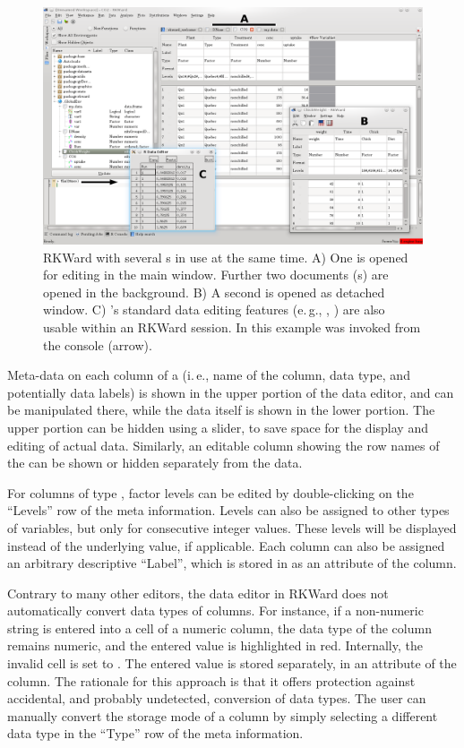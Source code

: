 \begin{figure}[htp]
 \centering
 \includegraphics[width=15.5cm]{../figures/data_editors.png}
 \caption{RKWard with several s in use at the same time. A) 
  One  is opened for editing in the main window. Further 
  two documents (s) are opened in the background. 
  B) A second  is opened as detached window. 
  C) 's standard data editing features (e.\,g., , ) 
  are also usable within an RKWard session. In this example  
  was invoked from the console (arrow).}
 \label{fig:data_editors}
\end{figure}

Meta-data on each column of a  (i.\,e., name of the column, data
type, and potentially data labels) is shown in the upper portion of
the data editor, and can be manipulated there, while the data itself is
shown in the lower portion. The upper portion can be hidden using a
slider, to save space for the display and editing of actual data.
Similarly, an editable column showing the row names of the 
can be shown or hidden separately from the data.

For columns of type , factor levels can be edited by double-clicking on the
``Levels'' row of the meta information. Levels can also be assigned to other types of
variables, but only for consecutive integer values. These levels will
be displayed instead of the underlying value, if applicable. Each
column can also be assigned an arbitrary descriptive
``Label'', which is stored in
 as an attribute of the column.

Contrary to many other editors, the data editor in RKWard does not
automatically convert data types of columns. For instance, if a
non-numeric string is entered into a cell of a numeric column, the data
type of the column remains numeric, and the entered value is
highlighted in red. Internally, the invalid cell is set to .
The entered value is stored separately, in an attribute of the column.
The rationale for this approach is that it offers protection against
accidental, and probably undetected, conversion of data types. The
user can manually convert the storage mode of a column by simply
selecting a different data type in the ``Type'' row of the meta information.

